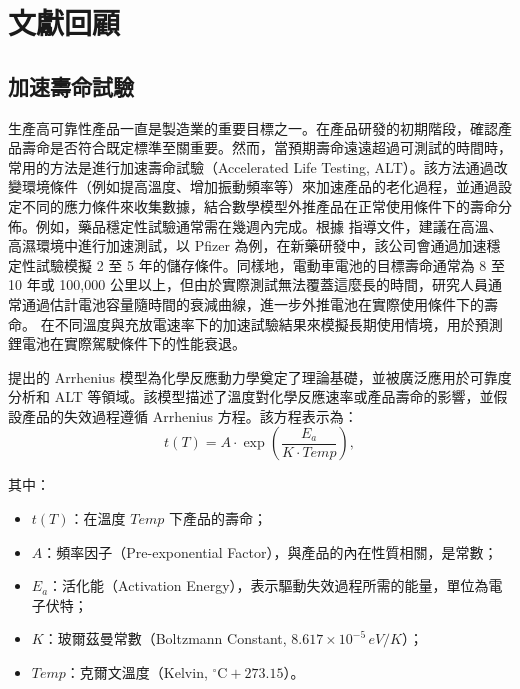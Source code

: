 \chapter{文獻回顧 \label{CH: review}}

\section{加速壽命試驗}

\hspace*{8mm} 生產高可靠性產品一直是製造業的重要目標之一。在產品研發的初期階段，確認產品壽命是否符合既定標準至關重要。然而，當預期壽命遠遠超過可測試的時間時，常用的方法是進行加速壽命試驗（Accelerated Life Testing, ALT）。該方法通過改變環境條件（例如提高溫度、增加振動頻率等）來加速產品的老化過程，並通過設定不同的應力條件來收集數據，結合數學模型外推產品在正常使用條件下的壽命分佈。例如，藥品穩定性試驗通常需在幾週內完成。根據 \cite{guideline2003stability} 指導文件，建議在高溫、高濕環境中進行加速測試，以 Pfizer 為例，在新藥研發中，該公司會通過加速穩定性試驗模擬 2 至 5 年的儲存條件。同樣地，電動車電池的目標壽命通常為 8 至 10 年或 100,000 公里以上，但由於實際測試無法覆蓋這麼長的時間，研究人員通常通過估計電池容量隨時間的衰減曲線，進一步外推電池在實際使用條件下的壽命。 \cite{uddin2017possibility} 在不同溫度與充放電速率下的加速試驗結果來模擬長期使用情境，用於預測鋰電池在實際駕駛條件下的性能衰退。


\hspace*{8mm} \cite{arrhenius1889reaktionsgeschwindigkeit} 提出的 Arrhenius 模型為化學反應動力學奠定了理論基礎，並被廣泛應用於可靠度分析和 ALT 等領域。該模型描述了溫度對化學反應速率或產品壽命的影響，並假設產品的失效過程遵循 Arrhenius 方程。該方程表示為：
\begin{equation} \label{Arrhenius model}
t(T) = A \cdot \exp\left( \frac{E_a}{K \cdot Temp} \right),
\end{equation}

其中：
\begin{itemize}
\item $t(T)$：在溫度 $Temp$ 下產品的壽命；
\item $A$：頻率因子（Pre-exponential Factor），與產品的內在性質相關，是常數；
\item $E_a$：活化能（Activation Energy），表示驅動失效過程所需的能量，單位為電子伏特；
\item $K$：玻爾茲曼常數（Boltzmann Constant, $8.617 \times 10^{-5} \, eV/K$）；
\item $Temp$：克爾文溫度（Kelvin, $^{\circ}\text{C}+273.15$）。
\end{itemize}

